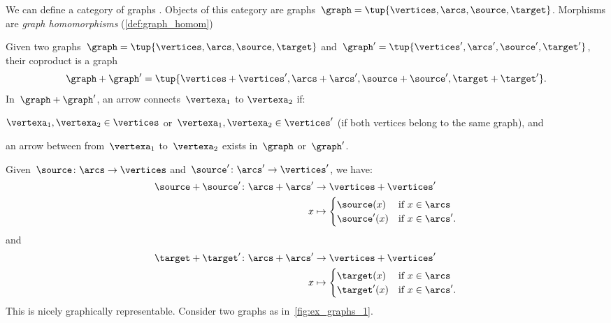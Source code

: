 \begin{example}
    \label{def:ex_graph}
    We can define a category of graphs \iindex{\Graph}. Objects of this category are graphs~$\graph=\tup{\vertices,\arcs,\source,\target}$.
    Morphisms are \emph{graph homomorphisms} (\cref{def:graph_homom})

    Given two graphs~$\graph=\tup{\vertices,\arcs,\source,\target}$ and~$\graph'=\tup{\vertices',\arcs',\source',\target'}$, their coproduct is a graph
    \begin{equation*}
        \graph+\graph'=\tup{\vertices+\vertices',\arcs+\arcs',\source+\source',\target+\target'}.
    \end{equation*}
    In~$\graph+\graph'$, an arrow connects~$\vertexa_1$ to $\vertexa_2$ if:
    \begin{compactitem}
        \item $\vertexa_1,\vertexa_2\in \vertices$ or~$\vertexa_1,\vertexa_2\in \vertices'$ (if both vertices belong to the same graph), and
        \item an arrow between from~$\vertexa_1$ to~$\vertexa_2$ exists in~$\graph$ or~$\graph'$.
    \end{compactitem}
    Given~$\source \colon \arcs \to \vertices$ and~$\source'\colon \arcs'\to \vertices'$, we have:
    \begin{equation*}
        \begin{aligned}
            \source+ \source'\colon \arcs+ \arcs'&\to \vertices+ \vertices'\\
            x&\mapsto
            \begin{cases}
                \source(x)& \text{if } x\in \arcs\\
                \source'(x)&\text{if } x\in \arcs'.
            \end{cases}
        \end{aligned}
    \end{equation*}
    and
    \begin{equation*}
        \begin{aligned}
            \target+\target '\colon \arcs+ \arcs '&\to \vertices+ \vertices'\\
            x&\mapsto
            \begin{cases}
                \target(x)& \text{if } x\in \arcs\\
                \target'(x)&\text{if } x\in \arcs'.
            \end{cases}
        \end{aligned}
    \end{equation*}
    This is nicely graphically representable. Consider two graphs as in~\cref{fig:ex_graphs_1}.


\end{example}
